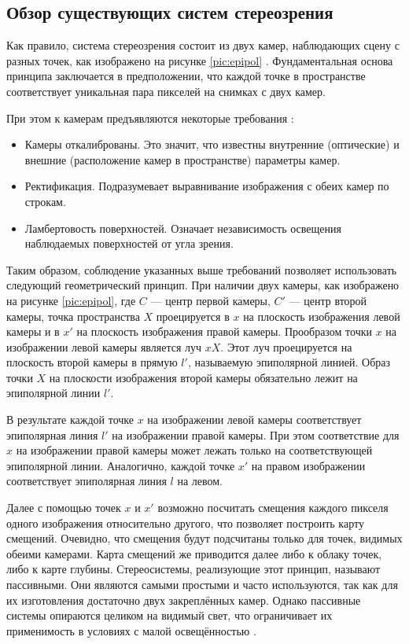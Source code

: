 
\subsection{Обзор существующих систем стереозрения}

Как правило, система стереозрения состоит из двух камер, наблюдающих сцену с разных точек, как изображено на рисунке \ref{pic:epipol} \cite{Hartley2004}. 
Фундаментальная основа принципа заключается в предположении, что каждой точке в пространстве соответствует уникальная пара пикселей на снимках с двух камер.  

При этом к камерам предъявляются некоторые требования \cite{rusoverview}:   %
\begin{itemize}
	\item Камеры откалиброваны. Это значит, что известны внутренние (оптические) и внешние (расположение камер в пространстве) параметры камер. 
	\item Ректификация. Подразумевает выравнивание изображения с обеих камер по строкам.  %
	\item Ламбертовость поверхностей. Означает независимость освещения наблюдаемых поверхностей от угла зрения. 
\end{itemize}

Таким образом, соблюдение указанных выше требований позволяет использовать следующий геометрический принцип. При наличии двух камеры, как изображено 
на рисунке \ref{pic:epipol}, где $C$ — центр первой камеры, $C'$ — центр второй камеры, точка пространства $X$  
проецируется в $x$ на плоскость изображения левой камеры и в $x'$ на плоскость изображения правой камеры. Прообразом точки $x$ на изображении левой 
камеры является луч $xX$. Этот луч проецируется на плоскость второй камеры в прямую $l'$, называемую эпиполярной линией. Образ точки $X$ на плоскости 
изображения второй камеры обязательно лежит на эпиполярной линии $l'$.


В результате каждой точке $x$ на изображении левой камеры соответствует эпиполярная линия $l'$ на изображении правой камеры. При этом соответствие для $x$ на 
изображении правой камеры может лежать только на соответствующей эпиполярной линии. Аналогично, каждой точке $x'$ на правом изображении соответствует 
эпиполярная линия $l$ на левом. 


Далее с помощью точек $x$ и $x'$ возможно посчитать смещения каждого пикселя одного изображения относительно другого, что позволяет построить карту смещений. 
Очевидно, что смещения будут подсчитаны только для точек, видимых обеими камерами. Карта смещений же приводится далее либо к облаку точек, либо к карте глубины. 
Стереосистемы, реализующие этот принцип, называют пассивными. Они являются самыми простыми и часто используются, так как для их изготовления достаточно 
двух закреплённых камер. Однако пассивные системы опираются целиком на видимый свет, что ограничивает их применимость в условиях с малой освещённостью \cite{find:passive_perfomance}. 

